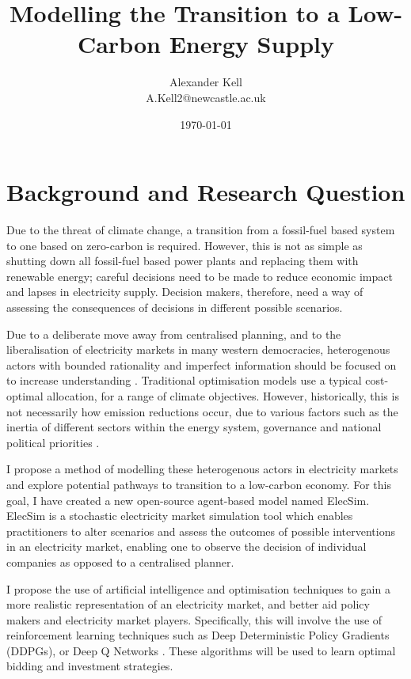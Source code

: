 \documentclass[12pt]{article}
\title{Modelling the Transition to a Low-Carbon Energy Supply}
\author{Alexander Kell \\ {A.Kell2@newcastle.ac.uk}}
\date{\today}
\begin{document}
\maketitle

\clearpage

\section{Background and Research Question}



Due to the threat of climate change, a transition from a fossil-fuel based system to one based on zero-carbon is required. However, this is not as simple as shutting down all fossil-fuel based power plants and replacing them with renewable energy; careful decisions need to be made to reduce economic impact and lapses in electricity supply. Decision makers, therefore, need a way of assessing the consequences of decisions in different possible scenarios. 

Due to a deliberate move away from centralised planning, and to the liberalisation of electricity markets in many western democracies, heterogenous actors with bounded rationality and imperfect information should be focused on to increase understanding \cite{Kraan2018}. Traditional optimisation models use a typical cost-optimal allocation, for a range of climate objectives. However, historically, this is not necessarily how emission reductions occur, due to various factors such as the inertia of different sectors within the energy system, governance and national political priorities  \cite{PyeS.PriceJ.CroninJ.ButnarI.andWelsby2019}.

I propose a method of modelling these heterogenous actors in electricity markets and explore potential pathways to transition to a low-carbon economy. For this goal, I have created a new open-source agent-based model named ElecSim. ElecSim is a stochastic electricity market simulation tool which enables practitioners to alter scenarios and assess the outcomes of possible interventions in an electricity market, enabling one to observe the decision of individual companies as opposed to a centralised planner.

I propose the use of artificial intelligence and optimisation techniques to gain a more realistic representation of an electricity market, and better aid policy makers and electricity market players. Specifically, this will involve the use of reinforcement learning techniques such as Deep Deterministic Policy Gradients (DDPGs)\cite{Hunt2016}, or Deep Q Networks \cite{Mnih2013}. These algorithms will be used to learn optimal bidding and investment strategies.
\end{document}
